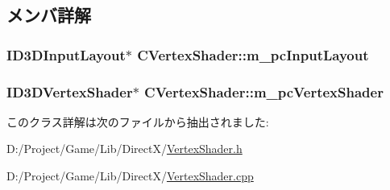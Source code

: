 \subsection{メンバ詳解}
\hypertarget{class_c_vertex_shader_a9194362254f16f3e89b0b0042c705a26}{}
\subsubsection[{m\+\_\+pc\+Input\+Layout}]{\setlength{\rightskip}{0pt plus 5cm}I\+D3\+D\+Input\+Layout$\ast$ C\+Vertex\+Shader\+::m\+\_\+pc\+Input\+Layout\hspace{0.3cm}{\ttfamily [private]}}\label{class_c_vertex_shader_a9194362254f16f3e89b0b0042c705a26}
\hypertarget{class_c_vertex_shader_af03968e57fbcebe385d94681b746c41c}{}
\subsubsection[{m\+\_\+pc\+Vertex\+Shader}]{\setlength{\rightskip}{0pt plus 5cm}I\+D3\+D\+Vertex\+Shader$\ast$ C\+Vertex\+Shader\+::m\+\_\+pc\+Vertex\+Shader\hspace{0.3cm}{\ttfamily [private]}}\label{class_c_vertex_shader_af03968e57fbcebe385d94681b746c41c}


このクラス詳解は次のファイルから抽出されました\+:\begin{DoxyCompactItemize}
\item 
D\+:/\+Project/\+Game/\+Lib/\+Direct\+X/\hyperlink{_vertex_shader_8h}{Vertex\+Shader.\+h}\item 
D\+:/\+Project/\+Game/\+Lib/\+Direct\+X/\hyperlink{_vertex_shader_8cpp}{Vertex\+Shader.\+cpp}\end{DoxyCompactItemize}
